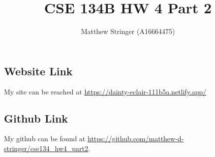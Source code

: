 \documentclass{article}
\title{CSE 134B HW 4 Part 2}
\author{
  Matthew Stringer (A16664475)
}
\theoremstyle{definition}
\begin{document}
    \maketitle
    \subsection*{Website Link}
    My site can be reached at \url{https://dainty-eclair-111b5a.netlify.app/}
    \subsection*{Github Link}
    My github can be found at \url{https://github.com/matthew-d-stringer/cse134_hw4_part2}.
\end{document}
